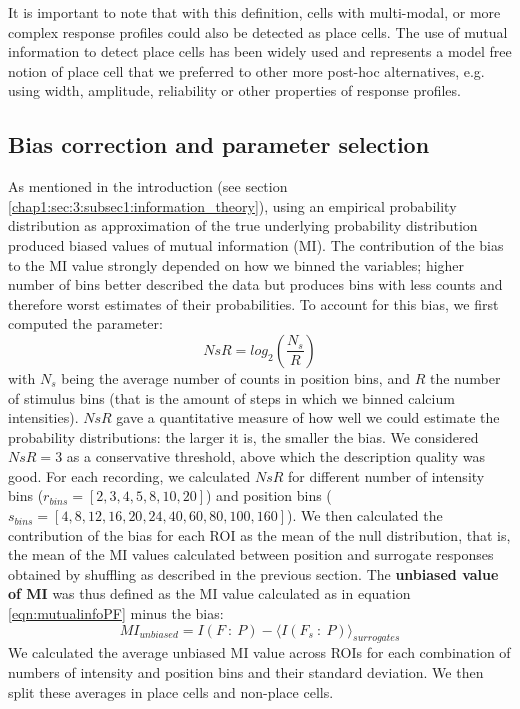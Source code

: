 It is important to note that with this definition, cells with multi-modal, or more complex response profiles could also be detected as place cells.
The use of mutual information to detect place cells has been widely used and represents a model free notion of place cell that we preferred to other more post-hoc alternatives, e.g. using width, amplitude, reliability or other properties of response profiles.

\subsection{Bias correction and parameter selection}
\label{chap3:sec:7:subsec3:bias_correction}
As mentioned in the introduction (see section \ref{chap1:sec:3:subsec1:information_theory}), using an empirical probability distribution as approximation of the true underlying probability distribution produced biased values of mutual information (MI). 
The contribution of the bias to the MI value strongly depended on how we binned the variables; higher number of bins better described the data but produces bins with less counts and therefore worst estimates of their probabilities. 
To account for this bias, we first computed the parameter: 
\begin{equation}
    \label{eqn:NsR}
    NsR = log_2(\frac{N_s}{R})
\end{equation}
with $N_s$ being the average number of counts in position bins, and $R$ the number of stimulus bins (that is the amount of steps in which we binned calcium intensities).
$NsR$ gave a quantitative measure of how well we could estimate the probability distributions: the larger it is, the smaller the bias. 
We considered $NsR=3$ as a conservative threshold, above which the description quality was good.
For each recording, we calculated $NsR$ for different number of intensity bins ($r_{bins} = [2,3,4,5,8,10,20]$) and position bins ($s_{bins} = [4,8,12,16,20,24,40,60,80,100,160]$).
We then calculated the contribution of the bias for each ROI as the mean of the null distribution, that is, the mean of the MI values calculated between position and surrogate responses obtained by shuffling as described in the previous section. 
The \textbf{unbiased value of MI} was thus defined as the MI value calculated as in equation \ref{eqn:mutualinfoPF} minus the bias:
\begin{equation}
    \label{eqn:unbias_mutualinfo}
    MI_{unbiased}=I(F\ :\ P) - \langle I(F_{s}\ :\ P)\rangle_{surrogates}
\end{equation}
We calculated the average unbiased MI value across ROIs for each combination of numbers of intensity and position bins and their standard deviation. We then split these averages in place cells and non-place cells. 
